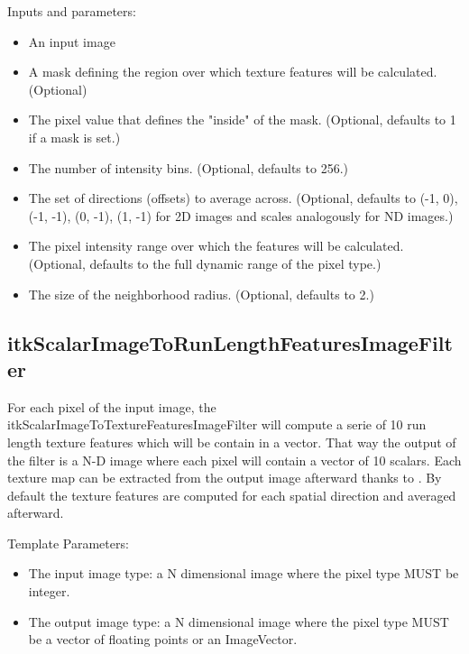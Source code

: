 \documentclass{InsightArticle}
\begin{document}
Inputs and parameters:
\begin{itemize}
 \item An input image
 \item A mask defining the region over which texture features will be calculated. (Optional)
 \item The pixel value that defines the "inside" of the mask. (Optional, defaults to 1 if a mask is set.)
 \item The number of intensity bins. (Optional, defaults to 256.)
 \item The set of directions (offsets) to average across. (Optional, defaults to {(-1, 0), (-1, -1), (0, -1), (1, -1)} for 2D images and scales analogously for ND images.)
 \item The pixel intensity range over which the features will be calculated. (Optional, defaults to the full dynamic range of the pixel type.)
 \item The size of the neighborhood radius. (Optional, defaults to 2.)
\end{itemize}

\subsection{itkScalarImageToRunLengthFeaturesImageFilter}
\label{sec:RLFilter}

For each pixel of the input image, the itkScalarImageToTextureFeaturesImageFilter will compute a serie of 10 run length texture features which will be contain in a vector. That way the output of the filter is a N-D image where each pixel will contain a vector of 10 scalars. Each texture map can be extracted from the output image afterward thanks to . By default the texture features are computed for each spatial direction and averaged afterward.

Template Parameters:
\begin{itemize}
 \item The input image type: a N dimensional image where the pixel type MUST be integer.
 \item The output image type: a N dimensional image where the pixel type MUST be a vector of floating points or an ImageVector.
\end{itemize} 
\end{document}
